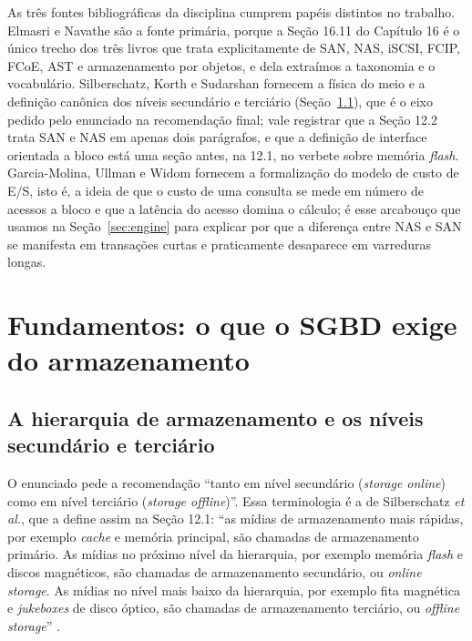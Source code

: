 \documentclass[11pt,a4paper]{article}
\begin{document}
As três fontes bibliográficas da disciplina cumprem papéis distintos no trabalho. Elmasri e Navathe
\cite{elmasri2018} são a fonte primária, porque a Seção 16.11 do Capítulo 16 é o único trecho dos
três livros que trata explicitamente de SAN, NAS, iSCSI, FCIP, FCoE, AST e armazenamento por
objetos, e dela extraímos a taxonomia e o vocabulário. Silberschatz, Korth e Sudarshan
\cite{silberschatz2020} fornecem a física do meio e a definição canônica dos níveis secundário e
terciário (Seção~\ref{sec:hierarquia}), que é o eixo pedido pelo enunciado na recomendação final;
vale registrar que a Seção 12.2 trata SAN e NAS em apenas dois parágrafos, e que a definição de
interface orientada a bloco está uma seção antes, na 12.1, no verbete sobre memória \textit{flash}.
Garcia-Molina, Ullman e Widom \cite{garciamolina2008} fornecem a formalização do modelo de custo de
E/S, isto é, a ideia de que o custo de uma consulta se mede em número de acessos a bloco e que a
latência do acesso domina o cálculo; é esse arcabouço que usamos na Seção~\ref{sec:engine} para
explicar por que a diferença entre NAS e SAN se manifesta em transações curtas e praticamente
desaparece em varreduras longas.

\section{Fundamentos: o que o SGBD exige do armazenamento}

\subsection{A hierarquia de armazenamento e os níveis secundário e terciário}
\label{sec:hierarquia}

O enunciado pede a recomendação ``tanto em nível secundário (\textit{storage online}) como em nível
terciário (\textit{storage offline})''. Essa terminologia é a de Silberschatz \textit{et al.}, que a
define assim na Seção 12.1: ``as mídias de armazenamento mais rápidas, por exemplo \textit{cache} e
memória principal, são chamadas de armazenamento primário. As mídias no próximo nível da hierarquia,
por exemplo memória \textit{flash} e discos magnéticos, são chamadas de armazenamento secundário, ou
\textit{online storage}. As mídias no nível mais baixo da hierarquia, por exemplo fita magnética e
\textit{jukeboxes} de disco óptico, são chamadas de armazenamento terciário, ou \textit{offline
storage}'' \cite{silberschatz2020}.
\end{document}

